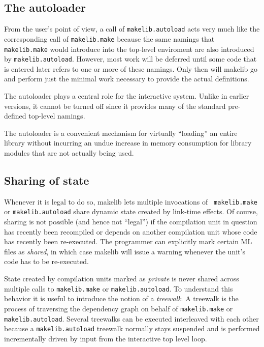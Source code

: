 \subsection{The autoloader}
\label{sec:autoload}

From the user's point of view, a call of {\tt makelib.autoload} acts very
much like the corresponding call of {\tt makelib.make} because the same
namings that {\tt makelib.make} would introduce into the top-level
enviroment are also introduced by {\tt makelib.autoload}.  However, most
work will be deferred until some code that is entered later refers to
one or more of these namings.  Only then will makelib go and perform just
the minimal work necessary to provide the actual definitions.

The autoloader plays a central role for the interactive system.
Unlike in earlier versions, it cannot be turned off since it provides
many of the standard pre-defined top-level namings.

The autoloader is a convenient mechanism for virtually ``loading'' an
entire library without incurring an undue increase in memory
consumption for library modules that are not actually being used.

\subsection{Sharing of state}
\label{sec:sharing}

Whenever it is legal to do so, makelib lets multiple invocations of {\tt
makelib.make} or {\tt makelib.autoload} share dynamic state created by link-time
effects.  Of course, sharing is not possible (and hence not ``legal'')
if the compilation unit in question has recently been recompiled or
depends on another compilation unit whose code has recently been
re-executed.  The programmer can explicitly mark certain ML files as
{\em shared}, in which case makelib will issue a warning whenever the
unit's code has to be re-executed.

State created by compilation units marked as {\em private} is never
shared across multiple calls to {\tt makelib.make} or {\tt makelib.autoload}.
To understand this behavior it is useful to introduce the notion of a
{\em treewalk}.  A treewalk is the process of traversing the
dependency graph on behalf of {\tt makelib.make} or {\tt makelib.autoload}.
Several treewalks can be executed interleaved with each other because
a {\tt makelib.autoload} treewalk normally stays suspended and is
performed incrementally driven by input from the interactive top level
loop.

